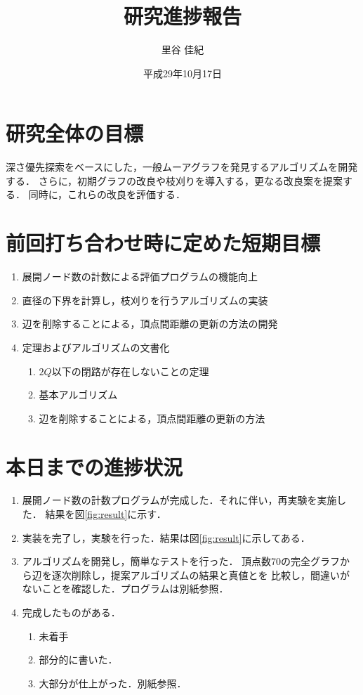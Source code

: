 \documentclass[11pt]{jarticle}
\title{研究進捗報告}
\author{里谷 佳紀}
\date{平成29年10月17日}
\begin{document}
%
\maketitle
\thispagestyle{empty}
%
\section{研究全体の目標}
深さ優先探索をベースにした，一般ムーアグラフを発見するアルゴリズムを開発する．
さらに，初期グラフの改良や枝刈りを導入する，更なる改良案を提案する．
同時に，これらの改良を評価する．
\section{前回打ち合わせ時に定めた短期目標}
\begin{enumerate}
\item 展開ノード数の計数による評価プログラムの機能向上
\item 直径の下界を計算し，枝刈りを行うアルゴリズムの実装
\item 辺を削除することによる，頂点間距離の更新の方法の開発
\item 定理およびアルゴリズムの文書化
  \begin{enumerate}
  \item $2Q$以下の閉路が存在しないことの定理
  \item 基本アルゴリズム
  \item 辺を削除することによる，頂点間距離の更新の方法
  \end{enumerate}
\end{enumerate}
\section{本日までの進捗状況}
\begin{enumerate}
\item 展開ノード数の計数プログラムが完成した．それに伴い，再実験を実施した．
  結果を図\ref{fig:result}に示す．
\item 実装を完了し，実験を行った．結果は図\ref{fig:result}に示してある．
\item アルゴリズムを開発し，簡単なテストを行った．
  頂点数70の完全グラフから辺を逐次削除し，提案アルゴリズムの結果と真値とを
  比較し，間違いがないことを確認した．プログラムは別紙参照．
\item 完成したものがある．
  \begin{enumerate}
  \item 未着手
  \item 部分的に書いた．
  \item 大部分が仕上がった．別紙参照．
  \end{enumerate}
\end{enumerate}
\end{document}
